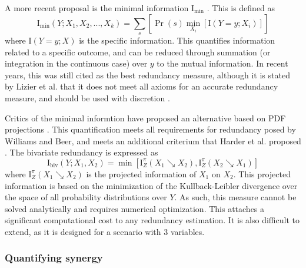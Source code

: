 \documentclass[../main.tex]{subfiles}
\begin{document}
A more recent proposal is the minimal information $\mathrm{I}_\mathrm{min}$ \cite{williams2010nonnegative}.
This is defined as
%
\begin{equation}
\mathrm{I}_\mathrm{min} \left( Y;{X_1, X_2,...,X_k} \right) = \sum_s [\Pr \left( s \right) \min_{X_i} [\mathrm{I}\left( Y=y;X_i \right)]]
\end{equation}
%
where $\mathrm{I}\left( Y = y;X \right)$ is the specific information.
This quantifies information related to a specific outcome, and can be reduced through summation (or integration in the continuous case) over $y$ to the mutual information.
In recent years, this was still cited as the best redundancy measure, although it is stated by Lizier et al. that it does not meet all axioms for an accurate redundancy measure, and should be used with discretion \cite{lizier2013towards, olbrich2015information}.

Critics of the minimal informtion have proposed an alternative based on PDF projections \cite{harder2013bivariate}.
This quantification meets all requirements for redundancy posed by Williams and Beer, and meets an additional criterium that Harder et al. proposed \cite{williams2010nonnegative, harder2013bivariate}.
The bivariate redundancy is expressed as
%
\begin{equation}
\mathrm{I}_\mathrm{biv} \left( Y;{X_1, X_2} \right) = \min [\mathrm{I}_Z^\pi \left( X_1 \searrow X_2 \right), \mathrm{I}_Z^\pi \left( X_2 \searrow X_1 \right)]
\end{equation}
%
where $\mathrm{I}_Z^\pi \left( X_1 \searrow X_2 \right)$ is the projected information of $X_1$ on $X_2$.
This projected information is based on the minimization of the Kullback-Leibler divergence over the space of all probability distributions over $Y$.
As such, this measure cannot be solved analytically and requires numerical optimization.
This attaches a significant computational cost to any redundancy estimation.
It is also difficult to extend, as it is designed for a scenario with 3 variables. %

\subsubsection{Quantifying synergy}
\end{document}
